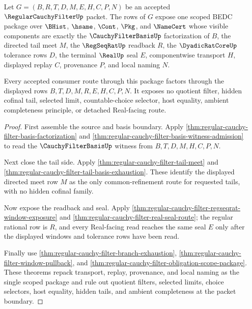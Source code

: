 \begin{theorem}
\label{thm:regular-cauchy-filter-scoped-handoff}
Let $G=(B,R,T,D,M,E,H,C,P,N)$ be an accepted $\RegularCauchyFilterUp$ packet. The rows of $G$ expose one scoped BEDC package over $\BHist$, $\hsame$, $\Cont$, $\Pkg$, and $\NameCert$ whose visible components are exactly the $\CauchyFilterBasisUp$ factorization of $B$, the directed tail meet $M$, the $\RegSeqRatUp$ readback $R$, the $\DyadicRatCoreUp$ tolerance rows $D$, the terminal $\RealUp$ seal $E$, componentwise transport $H$, displayed replay $C$, provenance $P$, and local naming $N$.

Every accepted consumer route through this package factors through the displayed rows $B,T,D,M,R,E,H,C,P,N$. It exposes no quotient filter, hidden cofinal tail, selected limit, countable-choice selector, host equality, ambient completeness principle, or detached Real-facing route.
\end{theorem}
\begin{proof}
First assemble the source and basis boundary. Apply \autoref{thm:regular-cauchy-filter-basis-factorization} and \autoref{thm:regular-cauchy-filter-basis-witness-admission} to read the $\CauchyFilterBasisUp$ witness from $B,T,D,M,H,C,P,N$.

Next close the tail side. Apply \autoref{thm:regular-cauchy-filter-tail-meet} and \autoref{thm:regular-cauchy-filter-tail-basis-exhaustion}. These identify the displayed directed meet row $M$ as the only common-refinement route for requested tails, with no hidden cofinal family.

Now expose the readback and seal. Apply \autoref{thm:regular-cauchy-filter-regseqrat-window-exposure} and \autoref{thm:regular-cauchy-filter-real-seal-route}; the regular rational row is $R$, and every Real-facing read reaches the same seal $E$ only after the displayed windows and tolerance rows have been read.

Finally use \autoref{thm:regular-cauchy-filter-branch-exhaustion}, \autoref{thm:regular-cauchy-filter-window-pullback}, and \autoref{thm:regular-cauchy-filter-obligation-scope-package}. These theorems repack transport, replay, provenance, and local naming as the single scoped package and rule out quotient filters, selected limits, choice selectors, host equality, hidden tails, and ambient completeness at the packet boundary.
\end{proof}

